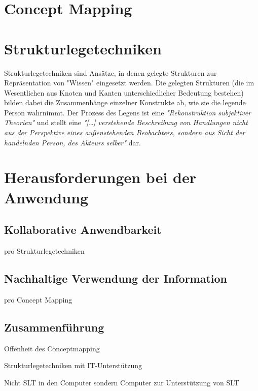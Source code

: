 
\section{Concept Mapping} %
\label{sec:concept_mapping}


\section{Strukturlegetechniken} %
\label{sec:strukturlegetechniken}

Strukturlegetechniken sind Ansätze, in denen gelegte Strukturen zur Repräsentation von "Wissen" eingesetzt werden. Die gelegten Strukturen (die im Wesentlichen aus Knoten und Kanten unterschiedlicher Bedeutung bestehen) bilden dabei die Zusammenhänge einzelner Konstrukte ab, wie sie die legende Person wahrnimmt. Der Prozess des Legens ist eine \emph{"Rekonstruktion subjektiver Theorien"} \citep{Dann92} und stellt eine \emph{"[\ldots] verstehende Beschreibung von Handlungen nicht aus der Perspektive eines außenstehenden Beobachters, sondern aus Sicht der handelnden Person, des Akteurs selber"} \citep{Dann92} dar. 


\section{Herausforderungen bei der Anwendung}
\label{sec:herausforderungen_bei_der_anwendung}

\subsection{Kollaborative Anwendbarkeit}

pro Strukturlegetechniken 

\subsection{Nachhaltige Verwendung der Information}

pro Concept Mapping

\subsection{Zusammenführung}

Offenheit des Conceptmapping

Strukturlegetechniken mit IT-Unterstützung

Nicht SLT in den Computer sondern Computer zur Unterstützung von SLT